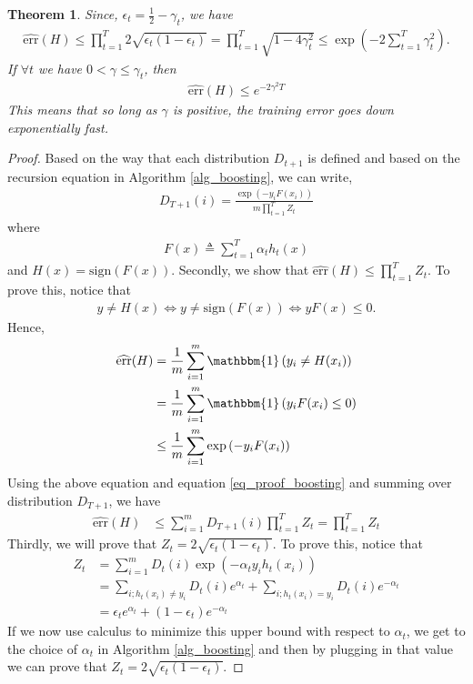 \documentclass[10pt ]{article}
\newtheorem{thm}{Theorem}
\begin{document}
\begin{thm}
{\em 
Since, $\epsilon_t = \frac{1}{2} -\gamma_t$, we have 
\begin{align}
\widehat{\mathrm{err}}(H) \le \prod_{t=1}^{T} 2 \sqrt{ \epsilon_t (1-\epsilon_t)} = \prod_{t=1}^{T} \sqrt{1-4\gamma_t^2} \le \exp \left( -2 \sum_{t=1}^T \gamma_t^2 \right).
\label{eq_thm_boosting}
\end{align}
If $\forall t$ we have $0<\gamma \le \gamma_t$, then 
\begin{align}
\widehat{\mathrm{err}}(H)  \le e^{-2 \gamma^2 T}
\label{eq_thm_boosting}
\end{align}
This means that so long as $\gamma$ is positive, the training error goes down exponentially fast. 
}\label{thm_boosting_err}
\end{thm}
\begin{proof}
Based on the way that each distribution $D_{t+1}$ is defined and based on the recursion equation in Algorithm \ref{alg_boosting}, we can write, 
\begin{align}
D_{T+1}(i) = \frac{\exp \left( -y_i F(x_i) \right)}{m \prod_{t=1}^T Z_t} 
\label{eq_proof_boosting}
\end{align}
where 
\begin{align}
F(x) \triangleq \sum_{t=1}^T \alpha_t h_t(x)
\end{align}
and $H(x) = \mathrm{sign}\left( F(x) \right)$. Secondly, we show that $\widehat{\mathrm{err}}(H) \le \prod_{t=1}^T Z_t$. To prove this, notice that
\begin{align}
 y \neq H(x) \Leftrightarrow y \neq \mathrm{sign}\left( F(x) \right) \Leftrightarrow yF(x) \le 0.
\end{align}
Hence, 
\begin{align}
\widehat{\mathrm{err}}(H) &= \frac{1}{m} \sum_{i=1}^m \mathbbm{1} \left( y_i \neq H(x_i) \right) \nonumber \\ 
&= \frac{1}{m} \sum_{i=1}^m \mathbbm{1} \left( y_i  F(x_i) \le 0 \right) \nonumber \\
&\le \frac{1}{m} \sum_{i=1}^m \exp \left( - y_i  F(x_i) \right)
\end{align}
Using the above equation and equation \eqref{eq_proof_boosting} and summing over distribution $D_{T+1}$, we have
\begin{align}
\widehat{\mathrm{err}}(H)  &\le  \sum_{i=1}^m D_{T+1}(i)    \prod_{t=1}^T Z_t = \prod_{t=1}^T Z_t
\end{align}
Thirdly, we will prove that $Z_t = 2 \sqrt{\epsilon_t (1 - \epsilon_t)}$. To prove this, notice that 
\begin{align}
Z_t &= \sum_{i=1}^m D_t(i) \exp \left( -\alpha_t y_i h_t(x_i) \right) \nonumber \\
&=\sum_{i; h_t(x_i) \neq y_i} D_t(i) e^{\alpha_t} +
\sum_{i; h_t(x_i) = y_i} D_t(i) e^{- \alpha_t} \nonumber \\
&= \epsilon_t  e^{\alpha_t} + (1-\epsilon_t) e^{- \alpha_t} \nonumber 
\end{align}
If we now use calculus to minimize this upper bound with respect to $\alpha_t$, we get to the choice of $\alpha_t$ in Algorithm \ref{alg_boosting} and then by plugging in that value we can prove that $Z_t = 2 \sqrt{\epsilon_t (1 - \epsilon_t)}$.
\end{proof}
\end{document}
